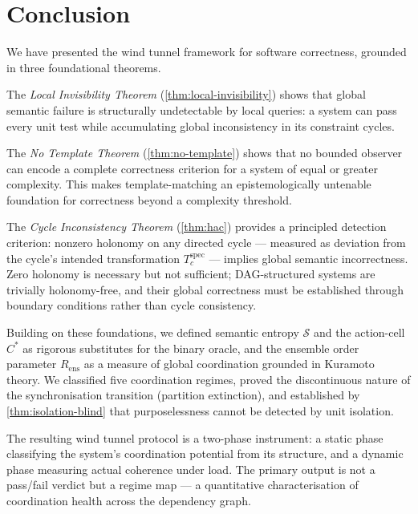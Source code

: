 \documentclass[twocolumn,a4paper,11pt]{article}
\theoremstyle{plain}
\theoremstyle{definition}
\theoremstyle{remark}
\begin{document}
\section{Conclusion}
\label{sec:conclusion}

We have presented the wind tunnel framework for software correctness,
grounded in three foundational theorems.

The \emph{Local Invisibility Theorem} (\cref{thm:local-invisibility})
shows that global semantic failure is structurally undetectable by local
queries: a system can pass every unit test while accumulating global
inconsistency in its constraint cycles.

The \emph{No Template Theorem} (\cref{thm:no-template}) shows that no
bounded observer can encode a complete correctness criterion for a system
of equal or greater complexity. This makes template-matching an
epistemologically untenable foundation for correctness beyond a complexity
threshold.

The \emph{Cycle Inconsistency Theorem} (\cref{thm:hac}) provides a
principled detection criterion: nonzero holonomy on any directed cycle ---
measured as deviation from the cycle's intended transformation
$T_c^{\mathrm{spec}}$ --- implies global semantic incorrectness. Zero
holonomy is necessary but not sufficient; DAG-structured systems are
trivially holonomy-free, and their global correctness must be established
through boundary conditions rather than cycle consistency.

Building on these foundations, we defined semantic entropy $\mathcal{S}$
and the action-cell $C^*$ as rigorous substitutes for the binary oracle,
and the ensemble order parameter $R_\mathrm{ens}$ as a measure of global
coordination grounded in Kuramoto theory. We classified five coordination
regimes, proved the discontinuous nature of the synchronisation transition
(partition extinction), and established by \cref{thm:isolation-blind}
that purposelessness cannot be detected by unit isolation.

The resulting wind tunnel protocol is a two-phase instrument: a static
phase classifying the system's coordination potential from its structure,
and a dynamic phase measuring actual coherence under load. The primary
output is not a pass/fail verdict but a regime map --- a quantitative
characterisation of coordination health across the dependency graph.
\end{document}
